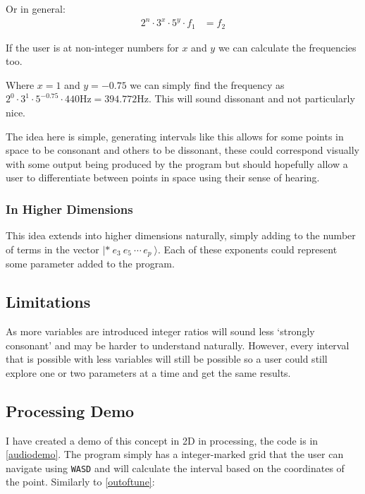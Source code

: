 Or in general:
\begin{align*}
    2^n \cdot 3^x \cdot 5^y \cdot f_1 &= f_2
\end{align*}

If the user is at non-integer numbers for $x$ and $y$ we can calculate the frequencies too.
\begin{figure}[H]
    \centering
    \caption{}
    \label{outoftune}
\end{figure}

Where $x=1$ and $y=-0.75$ we can simply find the frequency as $2^0 \cdot 3^1
\cdot 5^{-0.75} \cdot 440\si{\hertz} = 394.772\si{\hertz}$. This will sound
dissonant and not particularly nice.

The idea here is simple, generating intervals like this allows for some points
in space to be consonant and others to be dissonant, these could correspond
visually with some output being produced by the program but should hopefully
allow a user to differentiate between points in space using their sense of
hearing.

\subsubsection{In Higher Dimensions}
This idea extends into higher dimensions naturally, simply adding to the number
of terms in the vector $|*\ e_3\ e_5\ \cdots\, e_p\  \rangle$. Each of these
exponents could represent some parameter added to the program. 

\subsection{Limitations}
As more variables are introduced integer ratios will sound less `strongly
consonant' and may be harder to understand naturally. However, every interval
that is possible with less variables will still be possible so a user could
still explore one or two parameters at a time and get the same results.

\subsection{Processing Demo}
I have created a demo of this concept in 2D in processing, the code is in
\autoref{audiodemo}. The program simply has a integer-marked grid that the user
can navigate using \verb|WASD| and will calculate the interval based on the
coordinates of the point. Similarly to \autoref{outoftune}:

